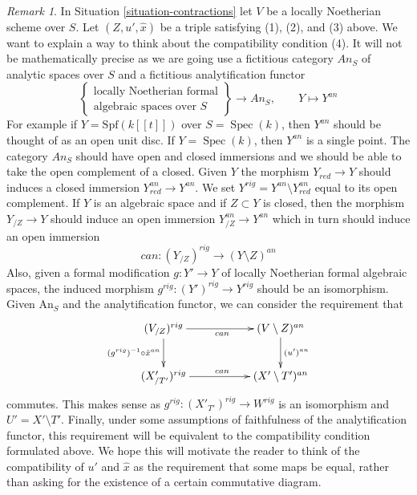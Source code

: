 \documentclass{stacks-project}
\theoremstyle{plain}
\theoremstyle{definition}
\theoremstyle{remark}
\newtheorem{remark}[subsection]{Remark}
\numberwithin{equation}{subsection}
\def\Spec{\mathop{\mathrm{Spec}}}
\begin{document}
\begin{remark}
\label{remark-how-to-think-compatibility}
In Situation \ref{situation-contractions} let $V$ be a locally Noetherian
scheme over $S$. Let $(Z, u', \hat x)$ be a triple satisfying (1), (2), and
(3) above. We want to explain a way to think about the compatibility
condition (4). It will not be mathematically precise as we are going use
a fictitious category $\textit{An}_S$ of analytic spaces over $S$
and a fictitious analytification functor
$$
\left\{
\begin{matrix}
\text{locally Noetherian formal} \\
\text{algebraic spaces over }S
\end{matrix}
\right\}
\longrightarrow
\textit{An}_S,
\quad\quad
Y \longmapsto Y^{an}
$$
For example if $Y = \text{Spf}(k[[t]])$ over $S = \Spec(k)$, then $Y^{an}$
should be thought of as an open unit disc. If $Y = \Spec(k)$, then $Y^{an}$
is a single point. The category $\textit{An}_S$ should have open and
closed immersions and we should be able to take the open complement
of a closed. Given $Y$ the morphism $Y_{red} \to Y$ should induces a
closed immersion $Y_{red}^{an} \to Y^{an}$. We set
$Y^{rig} = Y^{an} \setminus Y_{red}^{an}$ equal to its open complement.
If $Y$ is an algebraic space and if $Z \subset Y$ is closed, then
the morphism $Y_{/Z} \to Y$ should induce an open immersion
$Y_{/Z}^{an} \to Y^{an}$ which in turn should induce an open immersion
$$
can : (Y_{/Z})^{rig} \longrightarrow (Y \setminus Z)^{an}
$$
Also, given a formal modification $g : Y' \to Y$ of locally Noetherian formal
algebraic spaces, the induced morphism $g^{rig} : (Y')^{rig} \to Y^{rig}$
should be an isomorphism. Given $\text{An}_S$ and the analytification
functor, we can consider the requirement that
$$
\xymatrix{
(V_{/Z})^{rig} \ar[rr]_{can} \ar[d]_{(g^{rig})^{-1} \circ \hat x^{an}} & &
(V \setminus Z)^{an} \ar[d]^{(u')^{an}} \\
(X'_{/T'})^{rig} \ar[rr]^{can} & & (X' \setminus T')^{an}
}
$$
commutes. This makes sense as $g^{rig} : (X'_{T'})^{rig} \to W^{rig}$
is an isomorphism and $U' = X' \setminus T'$. Finally, under some assumptions
of faithfulness of the analytification functor, this requirement will
be equivalent to the compatibility condition formulated above.
We hope this will motivate the reader to think of the compatibility
of $u'$ and $\hat x$ as the requirement that some maps be equal,
rather than asking for the existence of a certain commutative diagram.
\end{remark}
\end{document}
